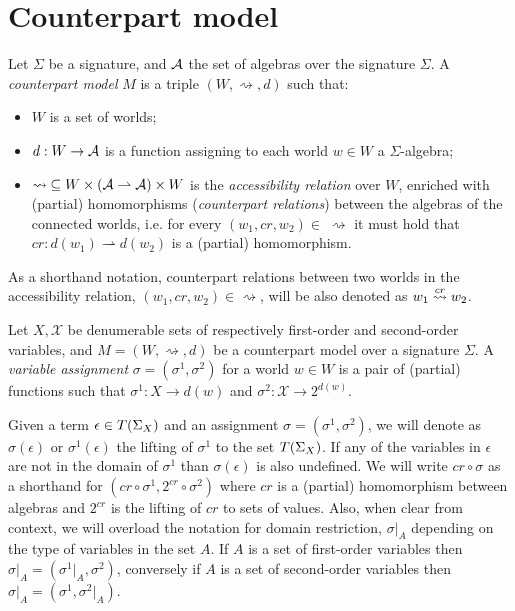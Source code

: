 \section{Counterpart model}

\begin{definition}
Let $\Sigma$ be a signature, and $\mathcal{A}$ the set of algebras over the signature $\Sigma$. A \emph{counterpart
model} $M$ is a triple $(W, \rightsquigarrow, d)$ such that:
\begin{itemize}
  \item $W$ is a set of worlds;
  \item $d : W \to \mathcal{A}$ is a function assigning to each world $w \in W$ a $\Sigma$-algebra;
  \item $\rightsquigarrow\;\subseteq W \times (\mathcal{A} \rightharpoonup \mathcal{A}) \times W$ is the
  \emph{accessibility relation} over $W$, enriched with (partial) homomorphisms (\emph{counterpart relations}) between
  the algebras of the connected worlds, i.e. for every $(w_1, cr, w_2) \in\;\rightsquigarrow$ it must hold that $cr :
  d(w_1) \rightharpoonup d(w_2)$ is a (partial) homomorphism.
\end{itemize}
\end{definition}

As a shorthand notation, counterpart relations between two worlds in the accessibility relation, $(w_1, cr, w_2) \in
\rightsquigarrow$, will be also denoted as $w_1 \overset{cr}{\rightsquigarrow} w_2$.

\begin{definition}
  Let $X, \mathcal{X}$ be denumerable sets of respectively first-order and second-order variables, and $M = (W,
  \rightsquigarrow, d)$ be a counterpart model over a signature $\Sigma$. A \emph{variable assignment} $\sigma =
  (\sigma^1, \sigma^2)$ for a world $w \in W$ is a pair of (partial) functions such that $\sigma^1 : X \to d(w)$
  and $\sigma^2 : \mathcal{X} \to 2^{d(w)}$.
\end{definition}

Given a term $\epsilon \in T({\Sigma}_{X})$ and an assignment $\sigma = (\sigma^1, \sigma^2)$, we will denote as
$\sigma(\epsilon)$ or $\sigma^1(\epsilon)$ the lifting of $\sigma^1$ to the set $T({\Sigma}_{X})$. If any of the
variables in $\epsilon$ are not in the domain of $\sigma^1$ than $\sigma(\epsilon)$ is also undefined.
We will write $cr \circ \sigma$ as a shorthand for $(cr \circ \sigma^1, 2^{cr} \circ \sigma^2)$ where $cr$ is a
(partial) homomorphism between algebras and $2^{cr}$ is the lifting of $cr$ to sets of values.
Also, when clear from context, we will overload the notation for domain restriction, $\sigma|_A$ depending on the type
of variables in the set $A$. If $A$ is a set of first-order variables then $\sigma|_A = (\sigma^1|_A, \sigma^2)$,
conversely if $A$ is a set of second-order variables then $\sigma|_A = (\sigma^1, \sigma^2|_A)$.

